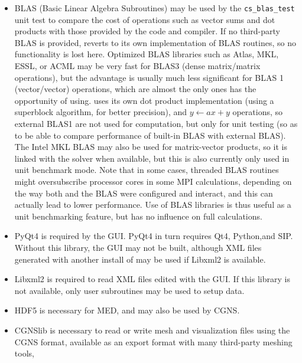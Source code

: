 \documentclass[a4paper,10pt,twoside]{csshortdoc}
\begin{document}
\begin{itemize}

\item BLAS (Basic Linear Algebra Subroutines) may be used by the
      \texttt{cs\_blas\_test} unit test to compare the cost of operations
      such as vector sums and dot products with those provided
      by the code and compiler.
      If no third-party BLAS is provided, \CS reverts to its own
      implementation of BLAS routines, so no functionality is lost here.
      Optimized BLAS libraries such as Atlas, MKL, ESSL, or ACML may be very
      fast for BLAS3 (dense matrix/matrix operations), but the advantage is
      usually much less significant for BLAS 1 (vector/vector) operations, which
      are almost the only ones \CS has the opportunity of using.
      \CS uses its own dot product implementation (using a superblock algorithm,
      for better precision), and $y \leftarrow ax+y$ operations, so external
      BLAS1 are not used for computation, but only for unit testing (so as
      to be able to compare performance of built-in BLAS with external BLAS).
      The Intel MKL BLAS may also be used for matrix-vector products, so it
      is linked with the solver when available, but this is also currently only
      used in unit benchmark mode.
      Note that in some cases, threaded BLAS routines might oversubscribe
      processor cores in some MPI calculations, depending on the way both
      \CS and the BLAS were configured and interact, and this can actually
      lead to lower performance.
      Use of BLAS libraries is thus useful as a unit benchmarking feature,
      but has no influence on full calculations.

\item PyQt4 is required by the \CS GUI. PyQt4 in turn requires Qt4,
      Python,and SIP. Without this library, the GUI may not be built,
      although XML files generated with another install of \CS
      may be used if Libxml2 is available.

\item Libxml2 is required to read XML files edited with the GUI.
      If this library is not available, only user subroutines may
      be used to setup data.

\item HDF5 is necessary for MED, and may also be used by CGNS.

\item CGNSlib is necessary to read or write mesh and visualization files
      using the CGNS format, available as an export format with many
      third-party meshing tools,


\end{itemize}
\end{document}
